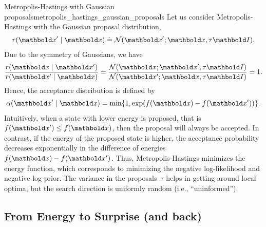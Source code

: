 \begin{ex}{Metropolis-Hastings with Gaussian proposals}{metropolis_hastings_gaussian_proposals}
  Let us consider Metropolis-Hastings with the Gaussian proposal distribution, \begin{align}
    r(\vxp \mid \vx) \defeq \N[\vxp]{\vx}{\tau \mI}.
  \end{align}
  Due to the symmetry of Gaussians, we have \begin{align*}
    \frac{r(\vx \mid \vxp)}{r(\vxp \mid \vx)} = \frac{\N[\vx]{\vxp}{\tau \mI}}{\N[\vxp]{\vx}{\tau \mI}} = 1.
  \end{align*}
  Hence, the acceptance distribution is defined by \begin{align}
    \alpha(\vxp \mid \vx) = \min \braces*{1, \exp(f(\vx) - f(\vxp))}.
  \end{align}
  Intuitively, when a state with lower energy is proposed, that is ${f(\vxp) \leq f(\vx)}$, then the proposal will always be accepted.
  In contrast, if the energy of the proposed state is higher, the acceptance probability decreases exponentially in the difference of energies ${f(\vx) - f(\vxp)}$.
  Thus, Metropolis-Hastings minimizes the energy function, which corresponds to minimizing the negative log-likelihood and negative log-prior.
  The variance in the proposals~$\tau$ helps in getting around local optima, but the search direction is uniformly random (i.e., ``uninformed'').
\end{ex}

\begin{marginfigure}
  \caption{Metropolis-Hastings and Langevin dynamics minimize the energy function $f(\theta)$ shown in blue.
  Suppose we start at the black dot $\theta_0$, then the black and red arrows denote possible subsequent samples.
  Metropolis-Hastings uses an ``uninformed'' search direction, whereas Langevin dynamics uses the gradient of $f(\theta)$ to make ``more promising'' proposals.
  The random proposals help get past local optima.}
\end{marginfigure}

\subsection{From Energy to Surprise (and back)}\label{sec:mcmc:energy_surprise}

